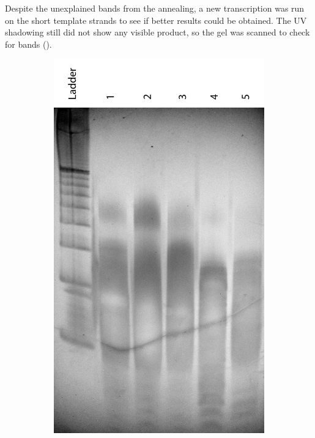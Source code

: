 Despite the unexplained bands from the annealing, a new transcription was run on the short template strands to see if better results could be obtained. The UV shadowing still did not show any visible product, so the gel was scanned to check for bands ().

\begin{figure}[h]
\begin{subfigure}[t]{.43\textwidth}
  \includegraphics[width=\textwidth]{images/translator_transcription_3.png}

\end{subfigure}
\end{figure}
